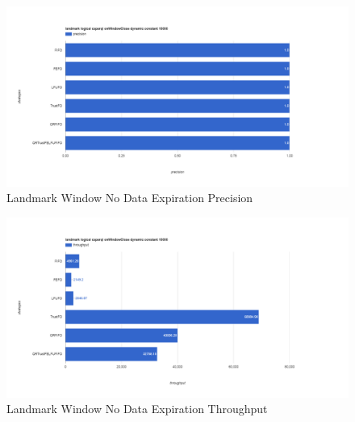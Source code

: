 \begin{figure}[!htbp]
	\centering
    \includegraphics[width=6.5in]{img/app3-land-no-p.png}
    \caption{Landmark Window No Data Expiration Precision}
\end{figure}
\begin{figure}[!htbp]
	\centering
    \includegraphics[width=6.5in]{img/app3-land-no-t.png}
    \caption{Landmark Window No Data Expiration Throughput}
\end{figure}
